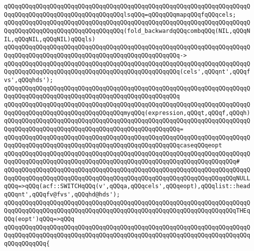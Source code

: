 \newline
\verb|qQQqqQQqqQQqqQQqqQQqqQQqqQQqqQQqqQQqqQQqqQQqqQQqqQQqqQQqqQQqqQQqqQQqqQQqqQQqqQQqqQQqqQQqqQQqqQQqqQQqqQQqlsqQQq=qQQqqQQqmapqQQqfqQQqcels;|\newline
\newline
\newline
\verb|qQQqqQQqqQQqqQQqqQQqqQQqqQQqqQQqqQQqqQQqqQQqqQQqqQQqqQQqqQQqqQQqqQQqqQQqqQQqqQQqqQQqqQQqqQQqqQQqqQQqqQQq(fold_backwardqQQqcombqQQq(NIL,qQQqNIL,qQQqNIL,qQQqNIL)qQQqls)|\newline
\verb|qQQqqQQqqQQqqQQqqQQqqQQqqQQqqQQqqQQqqQQqqQQqqQQqqQQqqQQqqQQqqQQqqQQqqQQqqQQqqQQqqQQqqQQqqQQqqQQqqQQqqQQqqQQqqQQqqQQqqQQq->|\newline
\verb|qQQqqQQqqQQqqQQqqQQqqQQqqQQqqQQqqQQqqQQqqQQqqQQqqQQqqQQqqQQqqQQqqQQqqQQqqQQqqQQqqQQqqQQqqQQqqQQqqQQqqQQqqQQqqQQqqQQqqQQq(cels',qQQqnt',qQQqfvs',qQQqhds');|\newline
\verb|qQQqqQQqqQQqqQQqqQQqqQQqqQQqqQQqqQQqqQQqqQQqqQQqqQQqqQQqqQQqqQQqqQQqqQQqqQQqqQQqqQQqqQQqqQQqqQQqqQQqqQQqqQQqqQQqqQQqqQQq|\newline
\newline
\verb|qQQqqQQqqQQqqQQqqQQqqQQqqQQqqQQqqQQqqQQqqQQqqQQqqQQqqQQqqQQqqQQqqQQqqQQqqQQqqQQqqQQqqQQqqQQqqQQqqQQqqQQqmyqQQq(expression,qQQqt,qQQqf,qQQqh)|\newline
\verb|qQQqqQQqqQQqqQQqqQQqqQQqqQQqqQQqqQQqqQQqqQQqqQQqqQQqqQQqqQQqqQQqqQQqqQQqqQQqqQQqqQQqqQQqqQQqqQQqqQQqqQQqqQQqqQQqqQQqqQQq=|\newline
\verb|qQQqqQQqqQQqqQQqqQQqqQQqqQQqqQQqqQQqqQQqqQQqqQQqqQQqqQQqqQQqqQQqqQQqqQQqqQQqqQQqqQQqqQQqqQQqqQQqqQQqqQQqqQQqqQQqqQQqqQQqcaseqQQqeopt|\newline
\verb|qQQqqQQqqQQqqQQqqQQqqQQqqQQqqQQqqQQqqQQqqQQqqQQqqQQqqQQqqQQqqQQqqQQqqQQqqQQqqQQqqQQqqQQqqQQqqQQqqQQqqQQqqQQqqQQqqQQqqQQqqQQqqQQqqQQqqQQq#|\newline
\verb|qQQqqQQqqQQqqQQqqQQqqQQqqQQqqQQqqQQqqQQqqQQqqQQqqQQqqQQqqQQqqQQqqQQqqQQqqQQqqQQqqQQqqQQqqQQqqQQqqQQqqQQqqQQqqQQqqQQqqQQqqQQqqQQqqQQqqQQqNULLqQQq=>qQQq(acf::SWITCHqQQq(v',qQQqa,qQQqcels',qQQqeopt),qQQqlist::headqQQqnt',qQQqfv@fvs',qQQqhd@hds');|\newline
\newline
\verb|qQQqqQQqqQQqqQQqqQQqqQQqqQQqqQQqqQQqqQQqqQQqqQQqqQQqqQQqqQQqqQQqqQQqqQQqqQQqqQQqqQQqqQQqqQQqqQQqqQQqqQQqqQQqqQQqqQQqqQQqqQQqqQQqqQQqqQQqTHEqQQq(eopt')qQQq=>qQQq|\newline
\verb|qQQqqQQqqQQqqQQqqQQqqQQqqQQqqQQqqQQqqQQqqQQqqQQqqQQqqQQqqQQqqQQqqQQqqQQqqQQqqQQqqQQqqQQqqQQqqQQqqQQqqQQqqQQqqQQqqQQqqQQqqQQqqQQqqQQqqQQqqQQqqQQqqQQqqQQq{|\newline
